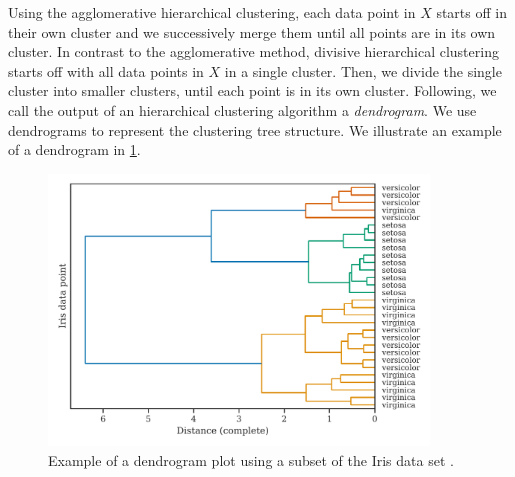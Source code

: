 Using the agglomerative hierarchical clustering, each data point in $X$ starts off in their own cluster and we successively merge them until all points are in its own cluster. In contrast to the agglomerative method, divisive hierarchical clustering starts off with all data points in $X$ in a single cluster. Then, we divide the single cluster into smaller clusters, until each point is in its own cluster. Following, we call the output of an hierarchical clustering algorithm a \textit{dendrogram}. We use dendrograms to represent the clustering tree structure. We illustrate an example of a dendrogram in \cref{fig:dendrogram-example}.
\begin{figure}[H]
    \centering
    \includegraphics[width=0.9\textwidth]{thesis/figures/dendrogram-example.pdf}
    \caption{Example of a dendrogram plot using a subset of the Iris data set \cite{Fisher1936}.}
    \label{fig:dendrogram-example}
\end{figure}

